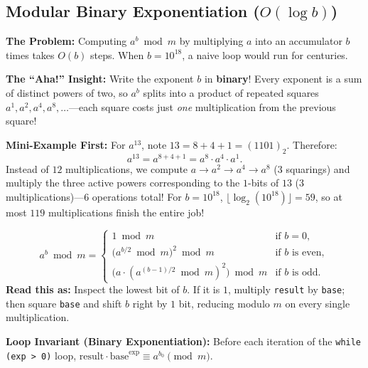 \documentclass[11pt,a4paper]{article}
\theoremstyle{definition}
\newcommand{\painbeat}{\textbf{\color{accentamber}The Problem:} }
\newcommand{\ahabeat}{\textbf{\color{accentteal}The ``Aha!'' Insight:} }
\newcommand{\examplebeat}{\textbf{\color{primaryblue}Mini-Example First:} }
\newcommand{\invariantbeat}[1]{\par\noindent\textbf{\color{accentteal}Loop Invariant (#1):} }
\begin{document}
\subsection{Modular Binary Exponentiation ($O(\log b)$)}

\painbeat Computing $a^b \bmod m$ by multiplying $a$ into an accumulator $b$ times takes $O(b)$ steps. When $b = 10^{18}$, a naive loop would run for centuries.

\ahabeat Write the exponent $b$ in \textbf{binary}! Every exponent is a sum of distinct powers of two, so $a^b$ splits into a product of repeated squares $a^1, a^2, a^4, a^8, \dots$---each square costs just \emph{one} multiplication from the previous square!

\examplebeat For $a^{13}$, note $13 = 8 + 4 + 1 = (1101)_2$. Therefore:
\[
    a^{13} = a^{8 + 4 + 1} = a^8 \cdot a^4 \cdot a^1.
\]
Instead of $12$ multiplications, we compute $a \to a^2 \to a^4 \to a^8$ (3 squarings) and multiply the three active powers corresponding to the $1$-bits of $13$ (3 multiplications)---6 operations total! For $b = 10^{18}$, $\lfloor \log_2(10^{18}) \rfloor = 59$, so at most $119$ multiplications finish the entire job!

\begin{formulabox}
\[
    a^b \bmod m =
    \begin{cases}
        1 \bmod m & \text{if } b = 0, \\
        \bigl(a^{b/2} \bmod m\bigr)^2 \bmod m & \text{if } b \text{ is even}, \\
        \bigl(a \cdot (a^{(b-1)/2} \bmod m)^2\bigr) \bmod m & \text{if } b \text{ is odd}.
    \end{cases}
\]
\textbf{Read this as:} Inspect the lowest bit of $b$. If it is $1$, multiply \texttt{result} by \texttt{base}; then square \texttt{base} and shift $b$ right by $1$ bit, reducing modulo $m$ on every single multiplication.
\end{formulabox}

\invariantbeat{Binary Exponentiation} Before each iteration of the \texttt{while (exp > 0)} loop, $\text{result} \cdot \text{base}^{\text{exp}} \equiv a^{b_0} \pmod m$.
\end{document}
